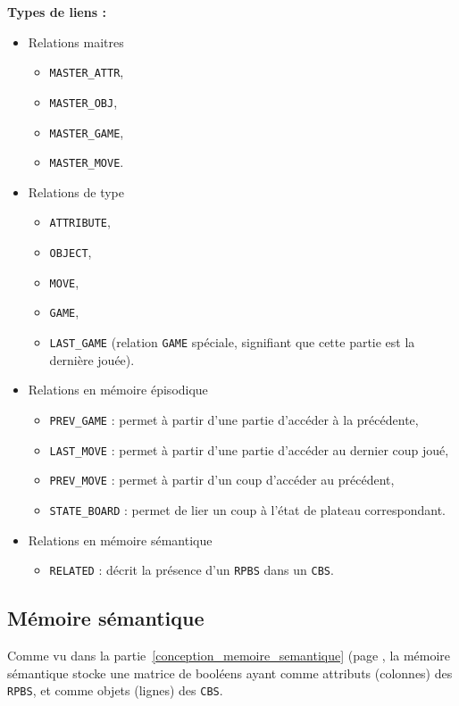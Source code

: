 \textbf{Types de liens :}
\begin{itemize}
	\item Relations maitres
		\begin{itemize}
			\item \texttt{MASTER\_ATTR},
			\item \texttt{MASTER\_OBJ},
			\item \texttt{MASTER\_GAME},
			\item \texttt{MASTER\_MOVE}.
		\end{itemize}
	\item Relations de type
		\begin{itemize}
			\item \texttt{ATTRIBUTE},
			\item \texttt{OBJECT},
			\item \texttt{MOVE},
			\item \texttt{GAME},
			\item \texttt{LAST\_GAME} (relation \texttt{GAME} spéciale, signifiant que cette partie est la dernière jouée).
		\end{itemize}
	\item Relations en mémoire épisodique
		\begin{itemize}
			\item \texttt{PREV\_GAME} : permet à partir d'une partie d'accéder à la précédente,
			\item \texttt{LAST\_MOVE} : permet à partir d'une partie d'accéder au dernier coup joué,
			\item \texttt{PREV\_MOVE} : permet à partir d'un coup d'accéder au précédent,
			\item \texttt{STATE\_BOARD} : permet de lier un coup à l'état de plateau correspondant.
		\end{itemize}
	\item Relations en mémoire sémantique
		\begin{itemize}
			\item \texttt{RELATED} : décrit la présence d'un \texttt{RPBS} dans un \texttt{CBS}.
		\end{itemize}
	\end{itemize}
	
\subsection{Mémoire sémantique}
Comme vu dans la partie~\ref{conception_memoire_semantique} (page \pageref{conception_memoire_semantique}, la mémoire sémantique stocke une matrice de booléens ayant comme attributs (colonnes) des \texttt{RPBS}, et comme objets (lignes) des \texttt{CBS}.

